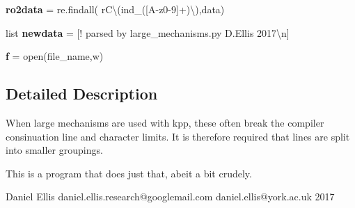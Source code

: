 \begin{DoxyCompactItemize}
\item 
\mbox{\label{namespacelarge__mechanisms_ae3030076975849d49c7f4ce786383c3b}} 
{\bfseries ro2data} = re.\+findall( r\textquotesingle{}C\textbackslash{}(ind\+\_\+(\mbox{[}A-\/z0-\/9\mbox{]}+)\textbackslash{})\textquotesingle{},data)
\item 
\mbox{\label{namespacelarge__mechanisms_a733fb04e88d77352cc51bad98f9bbba6}} 
list {\bfseries newdata} = \mbox{[}\textquotesingle{}! parsed by large\+\_\+mechanisms.\+py D.\+Ellis 2017\textbackslash{}n\textquotesingle{}\mbox{]}
\item 
\mbox{\label{namespacelarge__mechanisms_af4a68d1a15b82bf468f7504388a82f78}} 
{\bfseries f} = open(file\+\_\+name,\textquotesingle{}w\textquotesingle{})
\end{DoxyCompactItemize}


\subsection{Detailed Description}
\begin{DoxyVerb}When large mechanisms are used with kpp, these often break the compiler consinuation line and character limits. 
It is therefore required that lines are split into smaller groupings. 

This is a program that does just that, abeit a bit crudely. 

Daniel Ellis 
daniel.ellis.research@googlemail.com 
daniel.ellis@york.ac.uk 
2017\end{DoxyVerb}
 